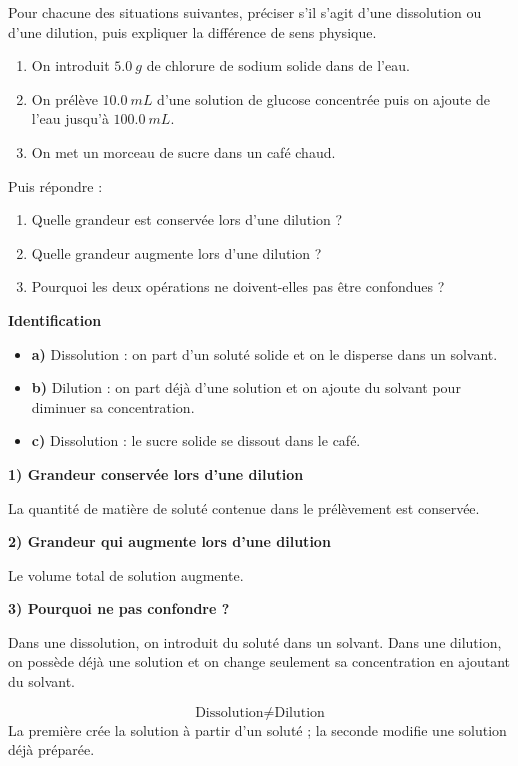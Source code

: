 \documentclass[11pt,a4paper]{article}
\begin{document}
\begin{enoncebox}
Pour chacune des situations suivantes, préciser s'il s'agit d'une dissolution ou d'une dilution, puis expliquer la différence de sens physique.

\begin{enumerate}[label=\alph*)]
    \item On introduit \(\SI{5.0}{g}\) de chlorure de sodium solide dans de l'eau.
    \item On prélève \(\SI{10.0}{mL}\) d'une solution de glucose concentrée puis on ajoute de l'eau jusqu'à \(\SI{100.0}{mL}\).
    \item On met un morceau de sucre dans un café chaud.
\end{enumerate}

Puis répondre :
\begin{enumerate}[label=\arabic*)]
    \item Quelle grandeur est conservée lors d'une dilution ?
    \item Quelle grandeur augmente lors d'une dilution ?
    \item Pourquoi les deux opérations ne doivent-elles pas être confondues ?
\end{enumerate}
\end{enoncebox}

\begin{corrigebox}
\textbf{Identification}

\begin{itemize}
    \item \textbf{a)} Dissolution : on part d'un soluté solide et on le disperse dans un solvant.
    \item \textbf{b)} Dilution : on part déjà d'une solution et on ajoute du solvant pour diminuer sa concentration.
    \item \textbf{c)} Dissolution : le sucre solide se dissout dans le café.
\end{itemize}

\textbf{1) Grandeur conservée lors d'une dilution}

La quantité de matière de soluté contenue dans le prélèvement est conservée.

\textbf{2) Grandeur qui augmente lors d'une dilution}

Le volume total de solution augmente.

\textbf{3) Pourquoi ne pas confondre ?}

Dans une dissolution, on introduit du soluté dans un solvant.  
Dans une dilution, on possède déjà une solution et on change seulement sa concentration en ajoutant du solvant.

\begin{bilanbox}
\[
\text{Dissolution} \neq \text{Dilution}
\]
La première crée la solution à partir d'un soluté ; la seconde modifie une solution déjà préparée.
\end{bilanbox}
\end{corrigebox}
\end{document}
